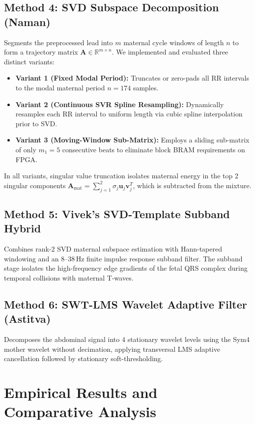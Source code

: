 \documentclass[10pt,twocolumn,letterpaper]{article}
\newcommand{\newcontent}[1]{\textcolor{midtermblue}{#1}}
\begin{document}
\subsection{Method 4: SVD Subspace Decomposition (Naman)}
\newcontent{Segments the preprocessed lead into $m$ maternal cycle windows of length $n$ to form a trajectory matrix $\mathbf{A} \in \mathbb{R}^{m \times n}$. We implemented and evaluated three distinct variants:
\begin{itemize}
    \item \textbf{Variant 1 (Fixed Modal Period):} Truncates or zero-pads all RR intervals to the modal maternal period $n = 174$ samples.
    \item \textbf{Variant 2 (Continuous SVR Spline Resampling):} Dynamically resamples each RR interval to uniform length via cubic spline interpolation prior to SVD.
    \item \textbf{Variant 3 (Moving-Window Sub-Matrix):} Employs a sliding sub-matrix of only $m_1 = 5$ consecutive beats to eliminate block BRAM requirements on FPGA.
\end{itemize}
In all variants, singular value truncation isolates maternal energy in the top 2 singular components $\mathbf{A}_{\text{mat}} = \sum_{j=1}^2 \sigma_j \mathbf{u}_j \mathbf{v}_j^T$, which is subtracted from the mixture.}

\subsection{Method 5: Vivek's SVD-Template Subband Hybrid}
\newcontent{Combines rank-2 SVD maternal subspace estimation with Hann-tapered windowing and an 8--38\,Hz finite impulse response subband filter. The subband stage isolates the high-frequency edge gradients of the fetal QRS complex during temporal collisions with maternal T-waves.}

\subsection{Method 6: SWT-LMS Wavelet Adaptive Filter (Astitva)}
\newcontent{Decomposes the abdominal signal into 4 stationary wavelet levels using the Sym4 mother wavelet without decimation, applying transversal LMS adaptive cancellation followed by stationary soft-thresholding.}

\section{Empirical Results and Comparative Analysis}
\label{sec:results}
\end{document}
